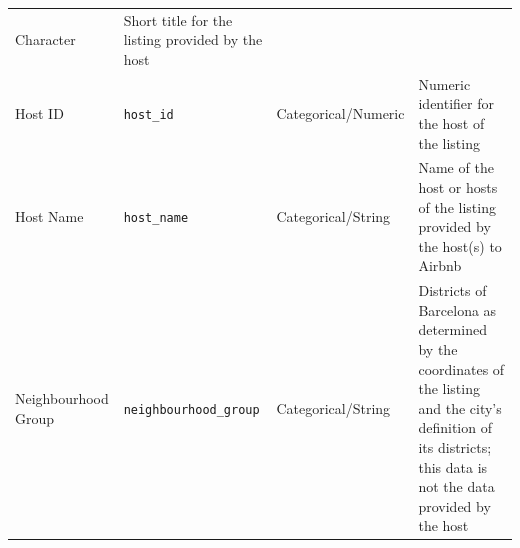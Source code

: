 \documentclass[]{article}
\begin{document}
\begin{longtable}[]{@{}llll@{}}
\begin{minipage}[t]{0.22\columnwidth}
Character\strut
\end{minipage} & \begin{minipage}[t]{0.22\columnwidth}\raggedright
Short title for the listing provided by the host\strut
\end{minipage}\tabularnewline
\begin{minipage}[t]{0.22\columnwidth}\raggedright
Host ID\strut
\end{minipage} & \begin{minipage}[t]{0.22\columnwidth}\raggedright
\texttt{host\_id}\strut
\end{minipage} & \begin{minipage}[t]{0.22\columnwidth}\raggedright
Categorical/Numeric\strut
\end{minipage} & \begin{minipage}[t]{0.22\columnwidth}\raggedright
Numeric identifier for the host of the listing\strut
\end{minipage}\tabularnewline
\begin{minipage}[t]{0.22\columnwidth}\raggedright
Host Name\strut
\end{minipage} & \begin{minipage}[t]{0.22\columnwidth}\raggedright
\texttt{host\_name}\strut
\end{minipage} & \begin{minipage}[t]{0.22\columnwidth}\raggedright
Categorical/String\strut
\end{minipage} & \begin{minipage}[t]{0.22\columnwidth}\raggedright
Name of the host or hosts of the listing provided by the host(s) to
Airbnb\strut
\end{minipage}\tabularnewline
\begin{minipage}[t]{0.22\columnwidth}\raggedright
Neighbourhood Group\strut
\end{minipage} & \begin{minipage}[t]{0.22\columnwidth}\raggedright
\texttt{neighbourhood\_group}\strut
\end{minipage} & \begin{minipage}[t]{0.22\columnwidth}\raggedright
Categorical/String\strut
\end{minipage} & \begin{minipage}[t]{0.22\columnwidth}\raggedright
Districts of Barcelona as determined by the coordinates of the listing
and the city's definition of its districts; this data is not the data
provided by the host\strut
\end{minipage}\tabularnewline

\end{longtable}
\end{document}
